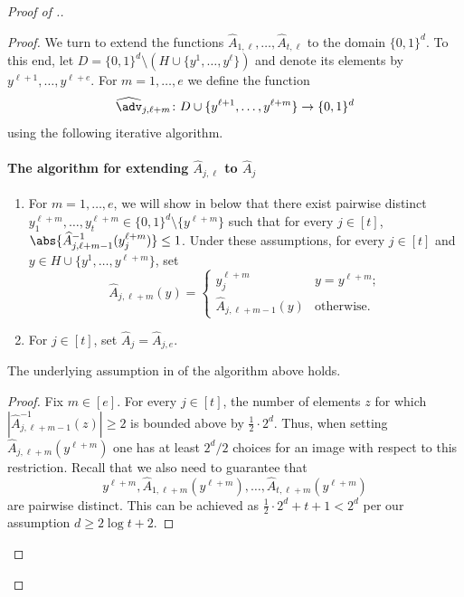 \documentclass{toc}
\begin{document}
\begin{proof}[Proof of .]
\begin{proof}
We turn to extend the functions $\widehat{A}_{1,\ell}, \ldots, \widehat{A}_{t,\ell}$ to the domain $\{0,1\}^d$. To this end,
let $D = \{0,1\}^d \setminus (H \cup \{y^1,\ldots,y^\ell\})$ and denote its elements by $y^{\ell+1},\ldots,y^{\ell+e}$. For $m=1,\ldots,e$ we define the function \[
\widehat{\adv}_{j,\ell+m} \colon D \cup \{y^{\ell+1},\ldots, y^{\ell+m}\} \to \{0,1\}^d
\]
using the following iterative algorithm.

%
\paragraph{The algorithm for extending $\widehat{A}_{j,\ell}$ to $\widehat{A}_{j}$}
\begin{enumerate}
%
	\item\label{It:assump21} For $m = 1,\ldots, e$, we will show in  below that there exist pairwise distinct $y^{\ell+m}_{1},\ldots,y^{\ell+m}_{t}\in \{0,1\}^d \setminus \{y^{\ell+m}\}$ such that for every $j \in [t]$, $\abs{\widehat{A}_{j,\ell+m-1}^{-1}(y^{\ell+m}_{j})} \le 1$. Under these assumptions, for every $j \in [t]$ and $y \in H \cup \{y^{1},\ldots, y^{\ell+m}\}$, set 
	\[\widehat{A}_{j,\ell+m}(y) = \begin{cases}
	y^{\ell+m}_{j} &  y = y^{\ell+m}; \\
	\widehat{A}_{j,\ell+m-1}(y) & \text{otherwise}.
	\end{cases}\]
	\item\label{It:assump22} For $j \in [t]$, set $\widehat{A}_{j} = \widehat{A}_{j,e}$.
	

	
\end{enumerate}

\begin{claim}\label{c:step 3}
	The underlying assumption in  of the algorithm above holds.
\end{claim}

\begin{proof}
	Fix $m \in [e]$. For every $j \in [t]$, the number of elements $z$ for which $|\widehat{A}^{-1}_{j,\ell+m-1}(z)| \ge 2$ is bounded above by $\frac1{2} \cdot 2^d$. Thus, when setting $\widehat{A}_{j,\ell+m}(y^{\ell+m})$ one has at least $2^d/2$ choices for an image with respect to this restriction. Recall that we also need to guarantee that
	\[
	y^{\ell+m}, \widehat{A}_{1,\ell+m}(y^{\ell+m}),\ldots,\widehat{A}_{t,\ell+m}(y^{\ell+m})\]
	are pairwise distinct. This can be achieved as $\frac1{2} \cdot 2^d+t+1 < 2^d$ per our assumption $d \ge 2\log{t}+2$.
\end{proof}


\end{proof}
\end{proof}
\end{document}
